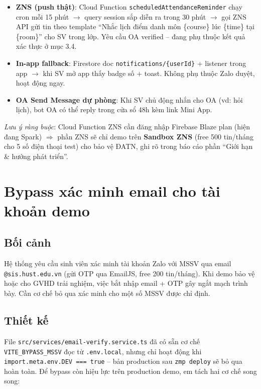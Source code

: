 \documentclass{article}
\begin{document}
\begin{itemize}[leftmargin=1.5em]
  \item \textbf{ZNS (push thật)}: Cloud Function \texttt{scheduledAttendanceReminder} chạy cron mỗi 15 phút $\to$ query session sắp diễn ra trong 30 phút $\to$ gọi ZNS API gửi tin theo template ``Nhắc lịch điểm danh môn \{course\} lúc \{time\} tại \{room\}'' cho SV trong lớp. Yêu cầu OA verified -- đang phụ thuộc kết quả xác thực ở mục 3.4.
  \item \textbf{In-app fallback}: Firestore doc \texttt{notifications/\{userId\}} + listener trong app $\to$ khi SV mở app thấy badge số + toast. Không phụ thuộc Zalo duyệt, hoạt động ngay.
  \item \textbf{OA Send Message dự phòng}: Khi SV chủ động nhắn cho OA (vd: hỏi lịch), bot OA có thể reply trong cửa sổ 48h kèm link Mini App.
\end{itemize}

\textit{Lưu ý ràng buộc}: Cloud Function ZNS cần đăng nhập Firebase Blaze plan (hiện đang Spark) $\Rightarrow$ phần ZNS sẽ chỉ demo trên \textbf{Sandbox ZNS} (free 500 tin/tháng cho 5 số điện thoại test) cho bảo vệ ĐATN, ghi rõ trong báo cáo phần ``Giới hạn \& hướng phát triển''.

\section{Bypass xác minh email cho tài khoản demo}

\subsection{Bối cảnh}

Hệ thống yêu cầu sinh viên xác minh tài khoản Zalo với MSSV qua email \texttt{@sis.hust.edu.vn} (gửi OTP qua EmailJS, free 200 tin/tháng). Khi demo bảo vệ hoặc cho GVHD trải nghiệm, việc bắt nhập email + OTP gây ngắt mạch trình bày. Cần cơ chế bỏ qua xác minh cho một số MSSV được chỉ định.

\subsection{Thiết kế}

File \texttt{src/services/email-verify.service.ts} đã có sẵn cơ chế \texttt{VITE\_BYPASS\_MSSV} đọc từ \texttt{.env.local}, nhưng chỉ hoạt động khi \texttt{import.meta.env.DEV === true} -- bản production sau \texttt{zmp deploy} sẽ bỏ qua hoàn toàn. Để bypass còn hiệu lực trên production demo, em tách hai cơ chế song song:
\end{document}
